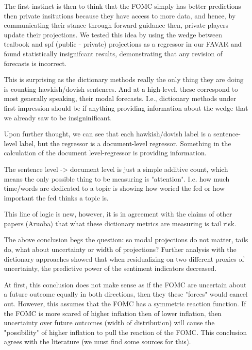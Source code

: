 \documentclass[11pt]{article}
\begin{document}
The first instinct is then to think that the FOMC simply has better predictions then private insitutions because they have access to more data, and hence, by communicating their stance through forward guidance then, private players update their projections. We tested this idea by using the wedge between tealbook and spf (public - private) projections as a regressor in our FAVAR and found statistically insignifcant results, demonstrating that any revision of forecasts is incorrect.

This is surprising as the dictionary methods really the only thing they are doing is counting hawkish/dovish sentences. And at a high-level, these correspond to most generally speaking, their modal forecasts. I.e., dictionary methods under first impression should be if anything providing information about the wedge that we already saw to be insigninificant.

Upon further thought, we can see that each hawkish/dovish label is a sentence-level label, but the regressor is a document-level regressor. Something in the calculation of the document level-regressor is providing information. 

The sentence level -> document level is just a simple additive count, which means the only possible thing to be measuring is "attention". I.e. how much time/words are dedicated to a topic is showing how woried the fed or how important the fed thinks a topic is.

This line of logic is new, however, it is in agreement with the claims of other papers (Aruoba) that what these dictionary metrics are measuring is tail risk. 

The above conclusion begs the question: so modal projections do not matter, tails do, what about uncertainty or width of projections? Further analysis with the dictionary approaches showed that when residualizing on two different proxies of uncertainty, the predictive power of the sentiment indicators decreased.

At first, this conclusion does not make sense as if the FOMC are uncertain about a future outcome equally in both directions, then they these "forces" would cancel out. However, this assumes that the FOMC has a symmetric reaction function. If the FOMC is more scared of higher inflation then of lower inflation, then uncertainty over future outcomes (width of distribution) will cause the "possibility" of higher inflation to pull the reaction of the FOMC. This conclusion agrees with the literature (we must find some sources for this).
\end{document}
